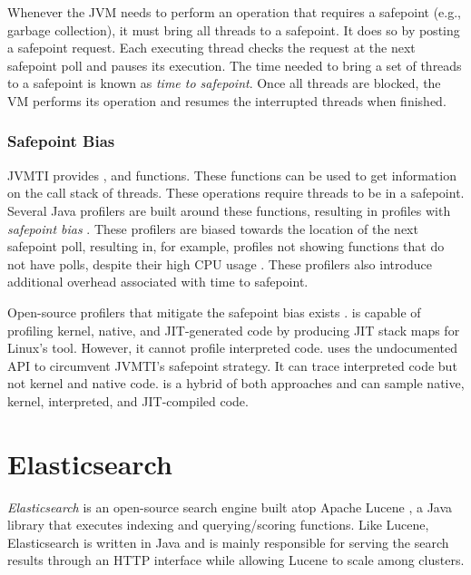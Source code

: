 Whenever the JVM needs to perform an operation that requires a safepoint (e.g., garbage collection), it must bring all threads to a safepoint. It does so by posting a safepoint request. Each executing thread checks the request at the next safepoint poll and pauses its execution. The time needed to bring a set of threads to a safepoint is known as \emph{time to safepoint}. Once all threads are blocked, the VM performs its operation and resumes the interrupted threads when finished.

\subsubsection*{Safepoint Bias}

JVMTI provides ,  and  functions. These functions can be used to get information on the call stack of threads. These operations require threads to be in a safepoint. Several Java profilers are built around these functions, resulting in profiles with \emph{safepoint bias} \cite{mytkowicz2010evaluating}. These profilers are biased towards the location of the next safepoint poll, resulting in, for example, profiles not showing functions that do not have polls, despite their high CPU usage \cite{wakart2016terrible}. These profilers also introduce additional overhead associated with time to safepoint.

Open-source profilers that mitigate the safepoint bias exists \cite{nisbet2019profiling}.  \cite{perfmapagent} is capable of profiling kernel, native, and JIT-generated code by producing JIT stack maps for Linux's  tool. However, it cannot profile interpreted code.  \cite{honestprofiler} uses the  undocumented API to circumvent JVMTI's safepoint strategy. It can trace interpreted code but not kernel and native code.  \cite{asyncprofiler} is a hybrid of both approaches and can sample native, kernel, interpreted, and JIT-compiled code.

\section{Elasticsearch}

\emph{Elasticsearch} is an open-source search engine built atop Apache Lucene \cite{bialecki2012lucene}, a Java library that executes indexing and querying/scoring functions. Like Lucene, Elasticsearch is written in Java and is mainly responsible for serving the search results through an HTTP interface while allowing Lucene to scale among clusters.

